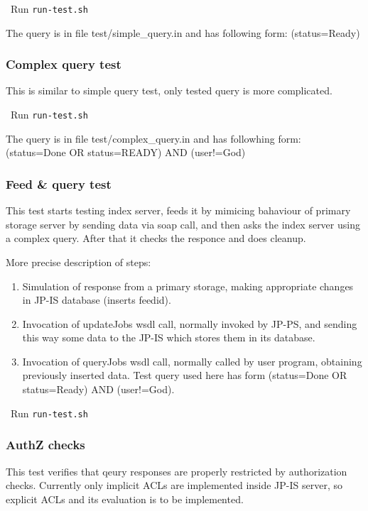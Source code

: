 \how\ Run \texttt{run-test.sh}

\begin{hints} 
The query is in file test/simple\_query.in and has following
  form: (status=Ready)
\end{hints}

\subsubsection{Complex query test}
This is similar to simple query test, only tested query is more complicated.

\how\ Run \texttt{run-test.sh}

\begin{hints}
The query is in file test/complex\_query.in and has followhing
  form: (status=Done OR status=READY) AND (user!=God)
\end{hints}

\subsubsection{Feed \& query test}
This test starts testing index server, feeds it by
mimicing bahaviour of primary storage server by sending data
via soap call, and then asks the index server using a complex
query. After that it checks the responce and does cleanup.

More precise description of steps:
\begin{enumerate}
 \item Simulation of response from a primary storage, making appropriate
   changes in JP-IS database (inserts feedid).
 \item Invocation of updateJobs wsdl call, normally invoked by JP-PS, and
   sending this way some data to the JP-IS which stores them in its database.
 \item Invocation of queryJobs wsdl call, normally called by user
   program, obtaining previously inserted data. Test query used here has form
   (status=Done OR status=Ready) AND (user!=God).
\end{enumerate}

\how\ Run \texttt{run-test.sh}

\subsubsection{AuthZ checks}
This test verifies that qeury responses are properly restricted by
authorization checks. Currently only implicit ACLs are implemented
inside JP-IS server, so explicit ACLs and its evaluation is to be implemented.

